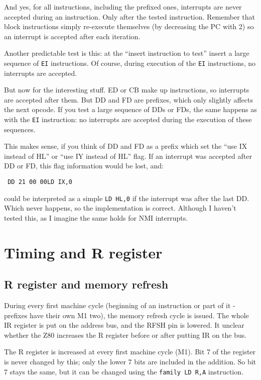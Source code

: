 \documentclass[twoside,openright,a4paper]{book}
\begin{document}
And yes, for all instructions, including the prefixed ones, interrupts are never accepted during an instruction. Only after the tested instruction. Remember that block instructions simply re-execute themselves (by decreasing the PC with 2) so an interrupt is accepted after each iteration.

Another predictable test is this: at the ``insert instruction to test'' insert a large sequence of {\tt EI} instructions. Of course, during execution of the {\tt EI} instructions, no interrupts are accepted. 

But now for the interesting stuff. ED or CB make up instructions, so interrupts are accepted after them. But DD and FD are prefixes, which only slightly affects the next opcode. If you test a large sequence of DDs or FDs, the same happens as with the {\tt EI} instruction: no interrupts are accepted during the execution of these sequences.

This makes sense, if you think of DD and FD as a prefix which set the ``use IX instead of HL'' or ``use IY instead of HL'' flag. If an interrupt was accepted after DD or FD, this flag information would be lost, and:

{\tt 
	{\qquad}DD 21 00 00{\qquad}LD IX,0
}

could be interpreted as a simple {\tt LD HL,0} if the interrupt was after the last DD. Which never happens, so the implementation is correct. Although I haven't tested this, as I imagine the same holds for NMI interrupts. 




\section{Timing and R register}

\subsection{R register and memory refresh}

During every first machine cycle (beginning of an instruction or part of it - prefixes have their own M1 two), the memory refresh cycle is issued. The whole IR register is put on the address bus, and the RFSH pin is lowered.  It unclear whether the Z80 increases the R register before or after putting IR on the bus. 

The R register is increased at every first machine cycle (M1). Bit 7 of the register is never changed by this; only the lower 7 bits are included in the addition. So bit 7 stays the same, but it can be changed using the
{\tt family LD R,A} instruction.
\end{document}
